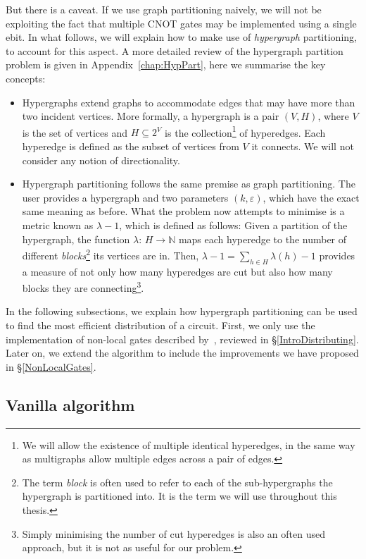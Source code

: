 But there is a caveat. If we use graph partitioning naively, we will not be exploiting the fact that multiple CNOT gates may be implemented using a single ebit. In what follows, we will explain how to make use of \textit{hypergraph} partitioning, to account for this aspect. A more detailed review of the hypergraph partition problem is given in Appendix~\ref{chap:HypPart}, here we summarise the key concepts:

\begin{itemize}
  \item Hypergraphs extend graphs to accommodate edges that may have more than two incident vertices. More formally, a hypergraph is a pair \((V,H)\), where \(V\) is the set of vertices and \(H \subseteq 2^V\) is the collection\footnote{We will allow the existence of multiple identical hyperedges, in the same way as multigraphs allow multiple edges across a pair of edges.} of hyperedges. Each hyperedge is defined as the subset of vertices from \(V\) it connects. We will not consider any notion of directionality.
  \item Hypergraph partitioning follows the same premise as graph partitioning. The user provides a hypergraph and two parameters \((k,\varepsilon)\), which have the exact same meaning as before. What the problem now attempts to minimise is a metric known as \(\lambda\!-\!1\), which is defined as follows: Given a partition of the hypergraph, the function \(\lambda\colon\, H \to \mathbb{N}\) maps each hyperedge to the number of different \textit{blocks}\footnote{The term \textit{block} is often used to refer to each of the sub-hypergraphs the hypergraph is partitioned into. It is the term we will use throughout this thesis.} its vertices are in. Then, \(\lambda\!-\!1 = \sum_{h \in H} \lambda(h) - 1\) provides a measure of not only how many hyperedges are cut but also how many blocks they are connecting\footnote{Simply minimising the number of cut hyperedges is also an often used approach, but it is not as useful for our problem.}.
\end{itemize}

In the following subsections, we explain how hypergraph partitioning can be used to find the most efficient distribution of a circuit. First, we only use the implementation of non-local gates described by~\citet{NonLocalCNOT}, reviewed in \S\ref{IntroDistributing}. Later on, we extend the algorithm to include the improvements we have proposed in \S\ref{NonLocalGates}.

\subsection{Vanilla algorithm}
\label{Vanilla}

